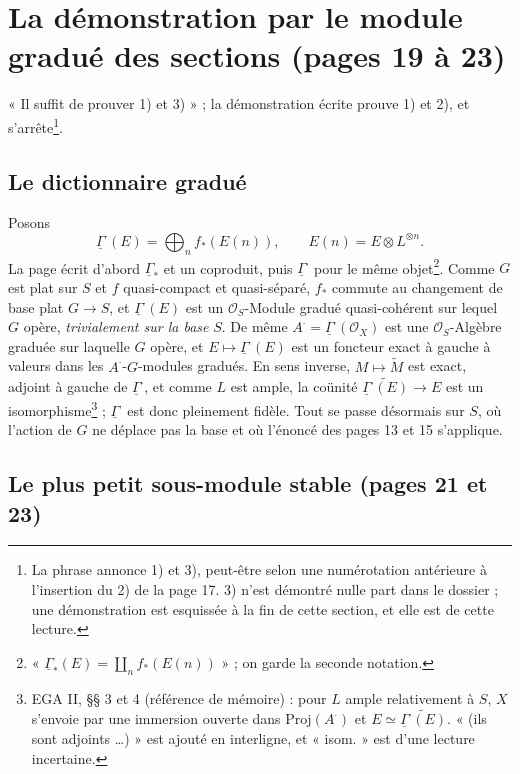 \documentclass[11pt,a4paper]{article}
\begin{document}
\section*{La démonstration par le module gradué des sections (pages 19 à 23)}

« Il suffit de prouver 1) et 3) » ; la démonstration écrite prouve 1) et
2), et s'arrête\footnote{La phrase annonce 1) et 3), peut-être selon une
numérotation antérieure à l'insertion du 2) de la page 17. 3) n'est
démontré nulle part dans le dossier ; une démonstration est esquissée à
la fin de cette section, et elle est de cette lecture.}.

\subsection*{Le dictionnaire gradué}

Posons
\[
  \underline{\Gamma}^{\cdot}(E) = \bigoplus_{n} f_{*}(E(n)), \qquad
  E(n) = E \otimes L^{\otimes n} .
\]
La page écrit d'abord $\underline{\Gamma}_{*}$ et un coproduit, puis
$\underline{\Gamma}^{\cdot}$ pour le même objet\footnote{« $\underline{\Gamma}_{*}(E)
= \coprod_n f_{*}(E(n))$ » ; on garde la seconde notation.}.
Comme $G$ est plat sur $S$ et $f$ quasi-compact et quasi-séparé,
$f_{*}$ commute au changement de base plat $G \to S$, et
$\underline{\Gamma}^{\cdot}(E)$ est un $\mathcal{O}_S$-Module gradué
quasi-cohérent sur lequel $G$ opère, \emph{trivialement sur la base} $S$.
De même $A^{\cdot} = \underline{\Gamma}^{\cdot}(\mathcal{O}_X)$ est une
$\mathcal{O}_S$-Algèbre graduée sur laquelle $G$ opère, et $E \mapsto
\underline{\Gamma}^{\cdot}(E)$ est un foncteur exact à gauche à valeurs dans
les $A^{\cdot}$-$G$-modules gradués. En sens inverse, $M \mapsto
\widetilde{M}$ est exact, adjoint à gauche de $\underline{\Gamma}^{\cdot}$,
et comme $L$ est ample, la coünité $\widetilde{\underline{\Gamma}^{\cdot}(E)}
\to E$ est un isomorphisme\footnote{EGA II, §§ 3 et 4 (référence de
mémoire) : pour $L$ ample relativement à $S$, $X$ s'envoie par une immersion
ouverte dans $\mathrm{Proj}(A^{\cdot})$ et $E \simeq
\widetilde{\underline{\Gamma}^{\cdot}(E)}$. « (ils sont adjoints \ldots) »
est ajouté en interligne, et « isom. » est d'une lecture incertaine.} ;
$\underline{\Gamma}^{\cdot}$ est donc pleinement fidèle. Tout se passe
désormais sur $S$, où l'action de $G$ ne déplace pas la base et où l'énoncé
des pages 13 et 15 s'applique.

\subsection*{Le plus petit sous-module stable (pages 21 et 23)}
\end{document}
